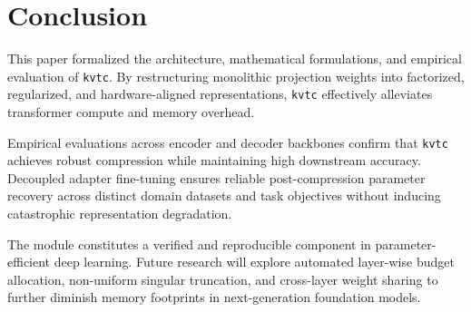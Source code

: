 \section{Conclusion}
This paper formalized the architecture, mathematical formulations, and empirical evaluation of \texttt{kvtc}. By restructuring monolithic projection weights into factorized, regularized, and hardware-aligned representations, \texttt{kvtc} effectively alleviates transformer compute and memory overhead.

Empirical evaluations across encoder and decoder backbones confirm that \texttt{kvtc} achieves robust compression while maintaining high downstream accuracy. Decoupled adapter fine-tuning ensures reliable post-compression parameter recovery across distinct domain datasets and task objectives without inducing catastrophic representation degradation.

The module constitutes a verified and reproducible component in parameter-efficient deep learning. Future research will explore automated layer-wise budget allocation, non-uniform singular truncation, and cross-layer weight sharing to further diminish memory footprints in next-generation foundation models.
